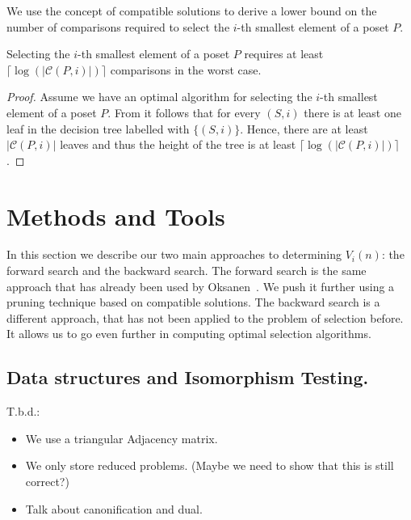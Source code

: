 \documentclass[twoside,leqno,twocolumn]{article}
\begin{document}
We use the concept of compatible solutions to derive a lower bound on the number of comparisons required to select the $i$-th smallest element of a poset $P$.

\begin{theorem}\label{theorem:compatible_log}
  Selecting the $i$-th smallest element of a poset $P$ requires at least $\lceil\log(|\mathcal{C}(P, i)|)\rceil$ comparisons in the worst case.
\end{theorem}

\begin{proof}
  Assume we have an optimal algorithm for selecting the $i$-th smallest element of a poset $P$.
  From  it follows that for every $(S, i)$ there is at least one leaf in the decision tree labelled with $\{(S, i)\}$.
  Hence, there are at least $|\mathcal{C}(P, i)|$ leaves and thus the height of the tree is at least $\lceil\log(|\mathcal{C}(P, i)|)\rceil$.
\end{proof}


\section{Methods and Tools}

In this section we describe our two main approaches to determining $V_i(n)$: the forward search and the backward search.
The forward search is the same approach that has already been used by Oksanen~\cite{Oksanen2006}.
We push it further using a pruning technique based on compatible solutions.
The backward search is a different approach, that has not been applied to the problem of selection before.
It allows us to go even further in computing optimal selection algorithms.

\subsection{Data structures and Isomorphism Testing.}
T.b.d.:
\begin{itemize}
  \item We use a triangular Adjacency matrix.
  \item We only store reduced problems. (Maybe we need to show that this is still correct?)
  \item Talk about canonification and dual.
\end{itemize}
\end{document}

